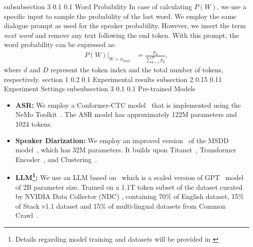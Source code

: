 \documentclass{article}
\makeatletter
\renewcommand{\section}{\@startsection
  {section}%
  {1}%
  {}%
  {0.2\baselineskip}%
  {0.1\baselineskip}%
  {}
}%
\renewcommand{\subsection}{\@startsection
  {subsection}%
  {2}%
  {}%
  {0.15\baselineskip}%
  {0.11\baselineskip}%
  {}}%
\renewcommand{\subsubsection}{\@startsection
  {subsubsection}%
  {3}%
  {}%
  {0.1\baselineskip}%
  {0.1\baselineskip}%
  {}}%
\makeatother
\begin{document}
\subsubsection{Word Probability}
In case of calculating $P(W)$, we use a specific input to sample the probability of the last word. We employ the same dialogue prompt as used for the speaker probability. However, we insert the term \textit{next word} and remove any text following the {\ttfamily \lbrack end\rbrack} token. With this prompt, the word probability can be expressed as:
\begin{align}
P(W)\rvert_{W=w_{\text{next}}} &= \frac{p_{d}}{\sum_{d=1}^{D} p_{d}}, \label{eq:llm_word_b1}
\end{align}
where $d$ and $D$ represent the token index and the total number of tokens, respectively.
\section{Experimental results}
\subsection{Experiment Settings}
\subsubsection{Pre-trained Models}
\begin{itemize}[leftmargin=*,labelsep=0.05em]
    \item \textbf{ASR:} We employ a Conformer-CTC model~\cite{gulati2020conformer} that is implemented using the NeMo Toolkit~\cite{kuchaiev2019nemo}. The ASR model has approximately 122M parameters and 1024 tokens. 
    \item \textbf{Speaker Diarization:} We employ an improved version~\cite{park2023chime} of the MSDD model~\cite{park2022multi}, which has 32M parameters. It builds upon Titanet~\cite{koluguri2022titanet}, Transformer Encoder~\cite{vaswani2017attention}, and Clustering~\cite{park2019auto}.
    \item \textbf{LLM\footnote{Details regarding model training and datasets will be provided in \cite{nvidia2023nemo}}:} We use an LLM based on~\cite{shoeybi2019megatron} which is a scaled version of GPT~\cite{radford2019language} model of 2B parameter size. Trained on a 1.1T token subset of the dataset curated by NVIDIA Data Collector (NDC) \cite{nvidia2023nemo}, containing 70\% of English dataset, 15\% of Stack v1.1 dataset \cite{huggingfaceBigcodethestackdedupDatasets} and 15\% of multi-lingual datasets from Common Crawl~\cite{luccioni2021s}.
\end{itemize}
\end{document}
